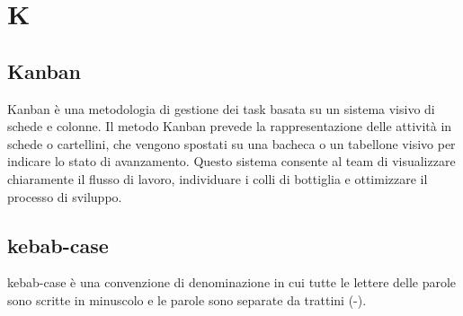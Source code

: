 \section{K}

\vspace{2em}
\subsection*{Kanban}
\par Kanban è una metodologia di gestione dei task basata su un sistema visivo di schede e colonne. Il metodo Kanban prevede la rappresentazione delle attività in schede o cartellini, che vengono spostati su una bacheca o un tabellone visivo per indicare lo stato di avanzamento. Questo sistema consente al team di visualizzare chiaramente il flusso di lavoro, individuare i colli di bottiglia e ottimizzare il processo di sviluppo.

\vspace{2em}
\subsection*{kebab-case}
\par kebab-case è una convenzione di denominazione in cui tutte le lettere delle parole sono scritte in minuscolo e le parole sono separate da trattini (-).
